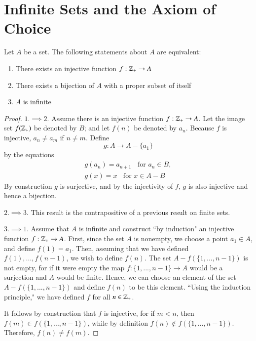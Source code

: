     \section{Infinite Sets and the Axiom of Choice}


    \begin{theorem}\label{thm:infequivs}
        Let $A$ be a set. The following statements about $A$ are equivalent:\begin{enumerate}
            \item There exists an injective function $f:\mathbb Z_+\rightarrow A$
            \item There exists a bijection of $A$ with a proper subset of itself
            \item $A$ is infinite
        \end{enumerate}
    \end{theorem}
    \begin{proof}
        $1.\implies 2.$ Assume there is an injective function $f:\mathbb Z_+\rightarrow A$. Let the image set $f(\mathbb Z_+)$ be denoted by $B$; and let $f(n)$ be denoted by $a_n$. Because $f$ is injective, $a_n\neq a_m$ if $n \neq m$. Define \begin{equation*}
            g:A\rightarrow A-\{a_1\}
        \end{equation*}
        by the equations \begin{align*}
            g(a_n) = a_{n+1}\;\;\text{ for }a_n \in B, \\
            g(x) = x\;\;\text{ for } x \in A-B
        \end{align*}
        By construction $g$ is surjective, and by the injectivity of $f$, $g$ is also injective and hence a bijection.

        $2.\implies 3.$ This result is the contrapositive of a previous result on finite sets.


        $3.\implies 1.$ Assume that $A$ is infinite and construct ``by induction" an injective function $f:\mathbb Z_+\rightarrow A$. First, since the set $A$ is nonempty, we choose a point $a_1 \in A$, and define $f(1) = a_1$. Then, assuming that we have defined $f(1),...,f(n-1)$, we wish to define $f(n)$. The set $A-f(\{1,...,n-1\})$ is not empty, for if it were empty the map $f:\{1,...,n-1\}\rightarrow A$ would be a surjection and $A$ would be finite. Hence, we can choose an element of the set $A-f(\{1,...,n-1\})$ and define $f(n)$ to be this element. ``Using the induction principle," we have defined $f$ for all $n \in \mathbb Z_+$.

        It follows by construction that $f$ is injective, for if $m < n$, then $f(m) \in f(\{1,...,n-1\})$, while by definition $f(n) \notin f(\{1,...,n-1\})$. Therefore, $f(n) \neq f(m)$.
    \end{proof}

